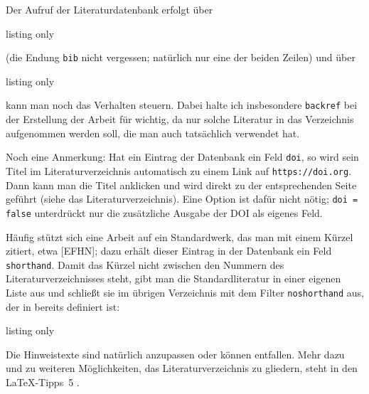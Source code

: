 Der Aufruf der Literaturdatenbank erfolgt über
%
\begin{tcblisting}{listing only}
\end{tcblisting}
%
(die Endung \texttt{bib} nicht vergessen; natürlich nur eine der beiden Zeilen) und über
%
\begin{tcblisting}{listing only}
\end{tcblisting}
%	
kann man noch das Verhalten steuern.
Dabei halte ich insbesondere \texttt{backref} bei der Erstellung der Arbeit für wichtig, da nur solche Literatur in das Verzeichnis aufgenommen werden soll, die man auch tatsächlich verwendet hat.

Noch eine Anmerkung: Hat ein Eintrag der Datenbank ein Feld \texttt{doi}, so wird sein Titel im Literaturverzeichnis automatisch zu einem Link auf \texttt{https://doi.org}.
Dann kann man die Titel anklicken und wird direkt zu der entsprechenden Seite geführt (siehe das Literaturverzeichnis).
Eine Option ist dafür nicht nötig; \texttt{doi = false} unterdrückt nur die zusätzliche Ausgabe der DOI als eigenes Feld.

Häufig stützt sich eine Arbeit auf ein Standardwerk, das man mit einem Kürzel zitiert, etwa [EFHN]; dazu erhält dieser Eintrag in der Datenbank ein Feld \texttt{shorthand}.
Damit das Kürzel nicht zwischen den Nummern des Literaturverzeichnisses steht, gibt man die Standardliteratur in einer eigenen Liste aus und schließt sie im übrigen Verzeichnis mit dem Filter \texttt{noshorthand} aus, der in  bereits definiert ist:
%
\begin{tcblisting}{listing only}
\printbibheading
{}
%
%
\printbibliography[heading=subbibliography,title={Literatur},
	prenote=hinweis2,check=noshorthand]
\end{tcblisting}
%
Die Hinweistexte sind natürlich anzupassen oder können entfallen.
Mehr dazu und zu weiteren Möglichkeiten, das Literaturverzeichnis zu gliedern, steht in den \LaTeX-Tipps~5 \cite{latextipps4}.
%
